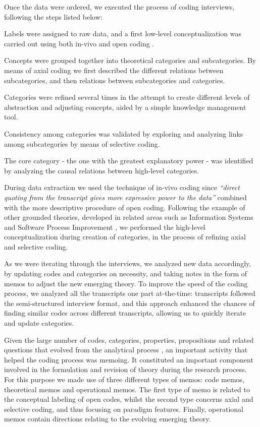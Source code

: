 \documentclass[12pt,journal,compsoc]{../sty/IEEEtran}
\begin{document}
\begin{table}[!t]
Once the data were ordered, we executed the process of coding interviews,
following the steps listed below:


\begin{compactitem}

\item Labels were assigned to raw data, and a first low-level conceptualization
was carried out using both in-vivo and open coding \cite{ColinRobson2009}. \item
Concepts were grouped together into theoretical categories and  subcategories.
By means of axial coding we first described the different  relations between
subcategories, and then relations between subcategories and  categories. \item
Categories were refined several times in the attempt to create different  levels
of abstraction and adjusting concepts, aided by a simple knowledge  management
tool. \item Consistency among categories was validated by exploring and
analyzing  links among subcategories by means of selective coding. \item The
core category - the one with the greatest explanatory power - was  identified by
analyzing the causal relations between high-level categories. \end{compactitem}


During data extraction we used the technique of in-vivo coding since
\textit{``direct quoting from the transcript gives more expressive power to the
data''} \cite{ColinRobson2009} combined with the more descriptive procedure of
open coding. Following the example of other grounded theories, developed in
related areas such as Information Systems \cite{Orlikowski1993} and Software
Process Improvement \cite{Coleman2006}, we performed the high-level
conceptualization during creation of categories, in the process of refining
axial and selective coding.

As we were iterating through the interviews, we analyzed new data accordingly,
by updating codes and categories on necessity, and taking notes in the form of
memos to adjust the new emerging theory. To improve the speed of the coding
process, we analyzed all the transcripts one part at-the-time: transcripts
followed the semi-structured interview format, and this approach enhanced the
chances of finding similar codes across different transcripts, allowing us to
quickly iterate and update categories.

Given the large number of codes, categories, properties, propositions and
related questions that evolved from the analytical process \cite{Corbin1990},
an important activity that helped the coding process was memoing. It constituted
an important component involved in the formulation and revision of theory
during the research process. For this purpose we made use of three different
types of memos: code memos, theoretical memos and operational memos. The first
type of memo is related to the conceptual labeling of open codes, whilst the
second type concerns axial and selective coding, and thus focusing on paradigm
features. Finally, operational memos contain directions relating to the evolving
emerging theory.


\end{table}
\end{document}
